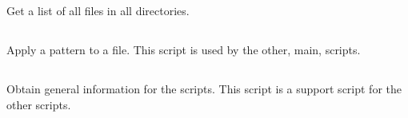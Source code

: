 
\newpage

\subsection{}
\label{UPtmpl}

Get a list of all files in all  directories.


\newpage

\subsection{}
\label{UPsed}

Apply a  pattern to a file. This script is used  by the other, main,
 scripts.


\newpage

\subsection{}
\label{UPinfo}

Obtain general information for the  scripts. This script is a support
script for the other  scripts.
